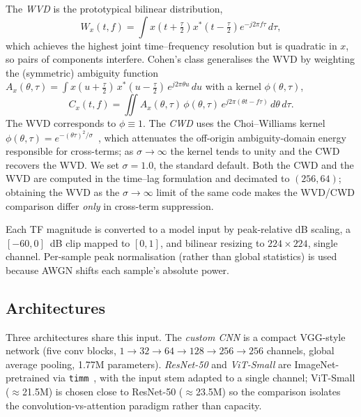 \documentclass[journal]{IEEEtran}
\begin{document}
The \emph{WVD} is the prototypical bilinear distribution,
\begin{equation}
W_x(t,f) = \int x\!\left(t+\tfrac{\tau}{2}\right)
x^*\!\left(t-\tfrac{\tau}{2}\right) e^{-j2\pi f\tau}\, d\tau ,
\end{equation}
which achieves the highest joint time--frequency resolution but is quadratic in
$x$, so pairs of components interfere. Cohen's class generalises the WVD by
weighting the (symmetric) ambiguity function
$A_x(\theta,\tau)=\int x(u+\tfrac{\tau}{2})\,x^*(u-\tfrac{\tau}{2})\,e^{j2\pi\theta
u}\,du$ with a kernel $\phi(\theta,\tau)$,
\begin{equation}
C_x(t,f) = \iint A_x(\theta,\tau)\,\phi(\theta,\tau)\,
e^{j2\pi(\theta t - f\tau)}\, d\theta\, d\tau .
\end{equation}
The WVD corresponds to $\phi\equiv1$. The \emph{CWD} uses the Choi--Williams
kernel $\phi(\theta,\tau)=e^{-(\theta\tau)^2/\sigma}$~\cite{choi1989}, which
attenuates the off-origin ambiguity-domain energy responsible for cross-terms; as
$\sigma\!\to\!\infty$ the kernel tends to unity and the CWD recovers the WVD. We
set $\sigma=1.0$, the standard default. Both the CWD and the WVD are computed in
the time--lag formulation and decimated to $(256,64)$; obtaining the WVD as the
$\sigma\!\to\!\infty$ limit of the same code makes the WVD/CWD comparison differ
\emph{only} in cross-term suppression.

Each TF magnitude is converted to a model input by peak-relative dB scaling, a
$[-60,0]$~dB clip mapped to $[0,1]$, and bilinear resizing to $224\times224$,
single channel. Per-sample peak normalisation (rather than global statistics) is
used because AWGN shifts each sample's absolute power.

\subsection{Architectures}
Three architectures share this input. The \emph{custom CNN} is a compact
VGG-style network (five conv blocks, $1{\to}32{\to}64{\to}128{\to}256{\to}256$
channels, global average pooling, 1.77M parameters). \emph{ResNet-50} and
\emph{ViT-Small} are ImageNet-pretrained via \texttt{timm}~\cite{wightman2019timm},
with the input stem adapted to a single channel; ViT-Small ($\approx$21.5M) is
chosen close to ResNet-50 ($\approx$23.5M) so the comparison isolates the
convolution-vs-attention paradigm rather than capacity.
\end{document}
